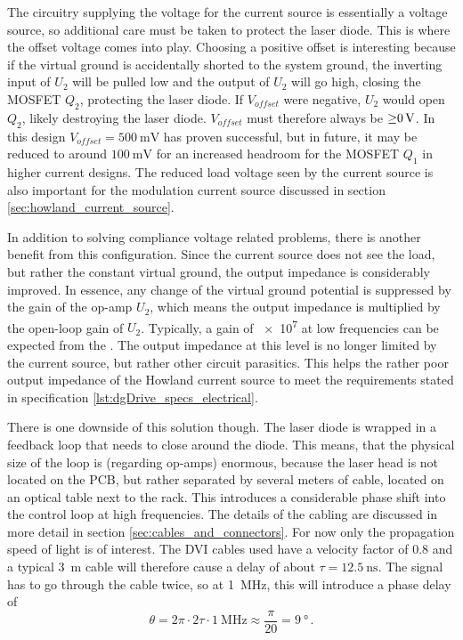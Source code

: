 The circuitry supplying the voltage for the current source is essentially a voltage source, so additional care must be taken to protect the laser diode. This is where the offset voltage comes into play. Choosing a positive offset is interesting because if the virtual ground is accidentally shorted to the system ground, the inverting input of $U_2$ will be pulled low and the output of $U_2$ will go high, closing the MOSFET $Q_2$, protecting the laser diode. If $V_{offset}$ were negative, $U_2$ would open $Q_2$, likely destroying the laser diode. $V_{offset}$ must therefore always be $\qty{\geq 0}{\V}$. In this design $V_{offset} = \qty{500}{\mV}$ has proven successful, but in future, it may be reduced to around $\qty{100}{\mV}$ for an increased headroom for the MOSFET $Q_1$ in higher current designs. The reduced load voltage seen by the current source is also important for the modulation current source discussed in section \ref{sec:howland_current_source}.

In addition to solving compliance voltage related problems, there is another benefit from this configuration. Since the current source does not see the load, but rather the constant virtual ground, the output impedance is considerably improved. In essence, any change of the virtual ground potential is suppressed by the gain of the op-amp $U_2$, which means the output impedance is multiplied by the open-loop gain of $U_2$. Typically, a gain of \num{e7} at low frequencies can be expected from the  \cite{datasheet_ADA4625}. The output impedance at this level is no longer limited by the current source, but rather other circuit parasitics. This helps the rather poor output impedance of the Howland current source to meet the requirements stated in specification \ref{lst:dgDrive_specs_electrical}.

There is one downside of this solution though. The laser diode is wrapped in a feedback loop that needs to close around the diode. This means, that the physical size of the loop is (regarding op-amps) enormous, because the laser head is not located on the PCB, but rather separated by several meters of cable, located on an optical table next to the rack. This introduces a considerable phase shift into the control loop at high frequencies. The details of the cabling are discussed in more detail in section \ref{sec:cables_and_connectors}. For now only the propagation speed of light is of interest. The DVI cables used have a velocity factor of \num{0.8} and a typical \qty{3}{\m} cable will therefore cause a delay of about $\tau = \qty{12.5}{\ns}$. The signal has to go through the cable twice, so at \qty{1}{\MHz}, this will introduce a phase delay of
\begin{equation*}
    \theta = 2 \pi \cdot 2 \tau \cdot \qty{1}{\MHz} \approx \frac{\pi}{20} = \qty{9}{\degree} \,.
\end{equation*}

